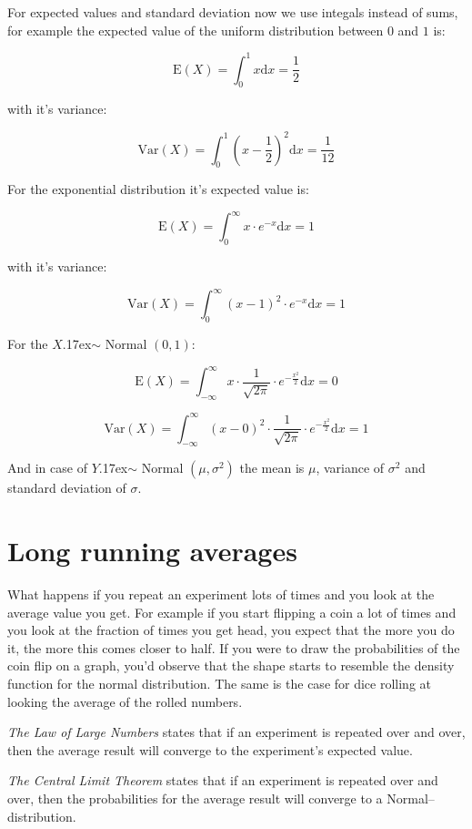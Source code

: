 For expected values and standard deviation now we use integals instead of sums,
for example the expected value of the uniform distribution between $0$ and $1$
is:

\[ \mbox{E}(X) = \int_{0}^{1}x\mbox{d}x = \frac{1}{2}  \]

with it's variance:

\[ \mbox{Var}(X) = \int_{0}^{1}\left(x - \frac{1}{2}\right)^2\mbox{d}x =
\frac{1}{12}
\]

For the exponential distribution it's expected value is:

\[ \mbox{E}(X) = \int_{0}^{\infty}x\cdot e^{-x}\mbox{d}x = 1  \]

with it's variance:

\[ \mbox{Var}(X) = \int_{0}^{\infty}\left(x - 1\right)^2\cdot e^{-x}\mbox{d}x =
1 \]

For the $X ${\raise.17ex\hbox{$\scriptstyle\mathtt{\sim}$}} Normal $(0,1)$: 

\[ \mbox{E}(X)  = \int_{-\infty}^{\infty}x \cdot \frac{1}{\sqrt{2\pi}}
\cdot e^{-\frac{x^2}{2}} \mbox{d}x = 0 
\]

\[ \mbox{Var}(X)  = \int_{-\infty}^{\infty} \left(x - 0\right)^2 \cdot
\frac{1}{\sqrt{2\pi}} \cdot e^{-\frac{x^2}{2}}\mbox{d}x = 1 
\]

And in case of $Y ${\raise.17ex\hbox{$\scriptstyle\mathtt{\sim}$}} Normal
$(\mu,\sigma^2)$ the mean is $\mu$, variance of $\sigma^2$ and standard
deviation of $\sigma$.

\section{Long running averages} 

What happens if you repeat an experiment lots of times and you look at the
average value you get. For example if you start flipping a coin a lot of times
and you look at the fraction of times you get head, you expect that the more you
do it, the more this comes closer to half. If you were to draw the probabilities
of the coin flip on a graph, you'd observe that the shape starts to resemble the
density function for the normal distribution. The same is the case for dice
rolling at looking the average of the rolled numbers.

\emph{The Law of Large Numbers} states that if an experiment is repeated over
and over, then the average result will converge to the experiment's expected value.

\emph{The Central Limit Theorem} states that if an experiment is repeated over
and over, then the probabilities for the average result will converge to a
Normal--distribution.

